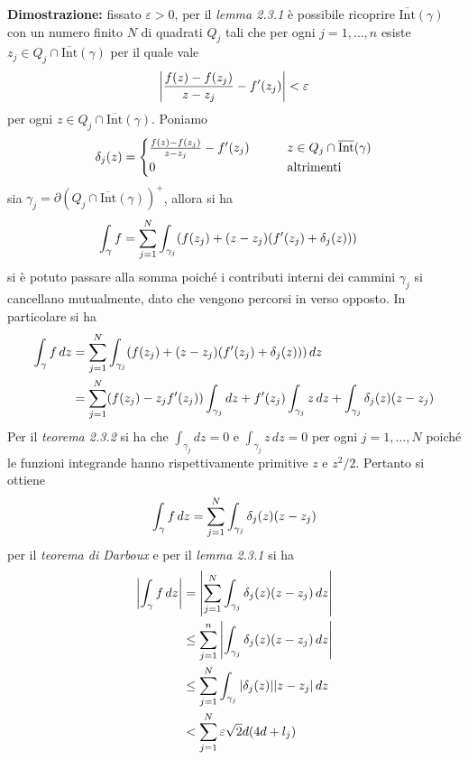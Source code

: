 \documentclass{article}
\begin{document}
\textbf{Dimostrazione:} fissato $\varepsilon > 0$, per il \textit{lemma 2.3.1} è possibile ricoprire $\overline{\mathrm{Int}}(\gamma)$ con un numero finito $N$ di quadrati $Q_j$ tali che per ogni $j = 1, \dots, n$ esiste $z_j \in Q_j \cap \overline{\mathrm{Int}}(\gamma)$ per il quale vale
\begin{gather}
    \left|\frac{f(z) - f(z_j)}{z - z_j} - f'(z_j)\right| < \varepsilon \notag
\end{gather}
per ogni $z \in Q_j \cap \overline{\mathrm{Int}}(\gamma)$. Poniamo
\begin{gather}
    \delta_j(z) = \begin{cases}
        \frac{f(z) - f(z_j)}{z - z_j} - f'(z_j) \qquad &z \in Q_j \cap \overline{\mathrm{Int}}(\gamma) \\
        0 \qquad &\text{altrimenti} 
    \end{cases} \notag
\end{gather}
sia $\gamma_j = \partial (Q_j \cap \overline{\mathrm{Int}}(\gamma))^+$, allora si ha
\begin{align}
    \int_\gamma f &= \sum_{j = 1}^N \int_{\gamma_j} (f(z_j) + (z - z_j)(f'(z_j) + \delta_j(z))) \notag
\end{align}
si è potuto passare alla somma poiché i contributi interni dei cammini $\gamma_j$ si cancellano mutualmente, dato che vengono percorsi in verso opposto. In particolare si ha
\begin{align}
    \int_\gamma f \, dz &= \sum_{j = 1}^N \int_{\gamma_j} (f(z_j) + (z - z_j)(f'(z_j) + \delta_j(z))) \, dz \notag \\
    &= \sum_{j = 1}^N (f(z_j) - z_jf'(z_j))\int_{\gamma_j} dz + f'(z_j)\int_{\gamma_j}z \, dz + \int_{\gamma_j} \delta_j(z)(z - z_j) \notag
\end{align}
Per il \textit{teorema 2.3.2} si ha che $\int_{\gamma_j} dz = 0$ e $\int_{\gamma_j} z \, dz = 0$ per ogni $j = 1, \dots, N$ poiché le funzioni integrande hanno rispettivamente primitive $z$ e $z^2/2$. Pertanto si ottiene
\begin{gather}
    \int_{\gamma} f \, dz = \sum_{j = 1}^N \int_{\gamma_j} \delta_j(z)(z - z_j) \notag
\end{gather}
per il \textit{teorema di Darboux} e per il \textit{lemma 2.3.1} si ha
\begin{align}
    \left|\int_\gamma f \, dz\right| &= \left|\sum_{j = 1}^N \int_{\gamma_j} \delta_j(z)(z - z_j) \, dz\right| \notag \\
    &\leq \sum_{j = 1}^n \left|\int_{\gamma_j}\delta_j(z)(z - z_j) \, dz\right| \notag \\
    &\leq \sum_{j = 1}^N \int_{\gamma_j}|\delta_j(z)||z - z_j| \, dz \notag \\
    &< \sum_{j = 1}^N \varepsilon\sqrt{2}d(4d + l_j) \notag
\end{align}
\end{document}
